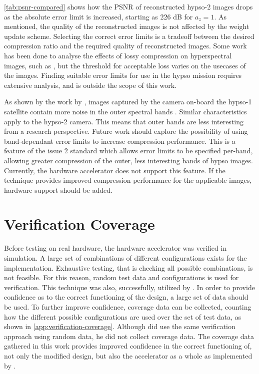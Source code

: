 \autoref{tab:psnr-compared} shows how the \acrshort{PSNR} of reconstructed \acrshort{hypso}-2 images drops as the absolute error limit is increased, starting as 226 dB for $a_z=1$. As mentioned, the quality of the reconstructed images is not affected by the weight update scheme. Selecting the correct error limits is a tradeoff between the desired compression ratio and the required quality of reconstructed images. Some work has been done to analyse the effects of lossy compression on hyperspectral images, such as \cite{chen2019compression, garcia2020competitive, garciavilchez2010impact}, but the threshold for acceptable loss varies on the usecases of the images. Finding suitable error limits for use in the \acrshort{hypso} mission requires extensive analysis, and is outside the scope of this work.

As shown by the work by \citeauthor{bakkenHYPSO1CubeSatFirst2023}, images captured by the camera on-board the \acrshort{hypso}-1 satellite contain more noise in the outer spectral bands \cite{bakkenHYPSO1CubeSatFirst2023}. Similar characteristics apply to the \acrshort{hypso}-2 camera. This means that outer bands are less interesting from a research perspective. Future work should explore the possibility of using band-dependant error limits to increase compression performance. This is a feature of the issue 2 standard which allows error limits to be specified per-band, allowing greater compression of the outer, less interesting bands of \acrshort{hypso} images. Currently, the hardware accelerator does not support this feature. If the technique provides improved compression performance for the applicable images, hardware support should be added.

\section{Verification Coverage}

Before testing on real hardware, the hardware accelerator was verified in simulation. A large set of combinations of different configurations exists for the implementation. Exhaustive testing, that is checking all possible combinations, is not feasible. For this reason, random test data and configurations is used for verification. This technique was also, successfully, utilized by \citeauthor{vorhaugHyperspectralImageCompression2024}. In order to provide confidence as to the correct functioning of the design, a large set of data should be used. To further improve confidence, coverage data can be collected, counting how the different possible configurations are used over the set of test data, as shown in \autoref{app:verification-coverage}. Although \citeauthor{vorhaugHyperspectralImageCompression2024} did use the same verification approach using random data, he did not collect coverage data. The coverage data gathered in this work provides improved confidence in the correct functioning of, not only the modified design, but also the accelerator as a whole as implemented by \citeauthor{vorhaugHyperspectralImageCompression2024}.

